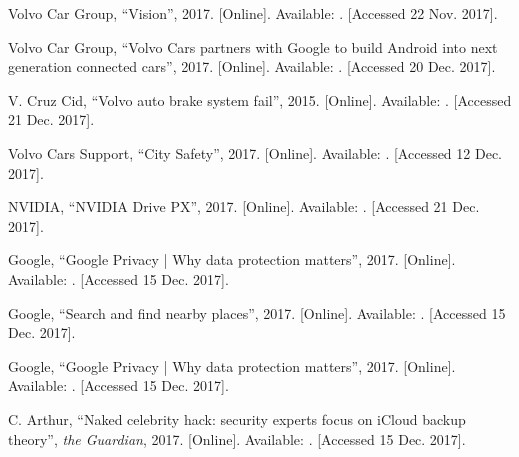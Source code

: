 \documentclass[conference]{IEEEtran}
\begin{document}
\begin{thebibliography}{00}
	Volvo Car Group,
	``Vision'',
	2017.
	[Online]. Available: 
	. 
	[Accessed 22 Nov. 2017].
	
	Volvo Car Group,
	``Volvo Cars partners with Google to build Android into next generation connected cars'',
	2017.
	[Online]. Available:
	.
	[Accessed 20 Dec. 2017].
	
	V. Cruz Cid,
	``Volvo auto brake system fail'',
	2015.
	[Online]. Available:
	.
	[Accessed 21 Dec. 2017].
	
	Volvo Cars Support,
	``City Safety'',
	2017.
	[Online]. Available: .
	[Accessed 12 Dec. 2017].
	
	NVIDIA,
	``NVIDIA Drive PX'',
	2017.
	[Online]. Available:
	.
	[Accessed 21 Dec. 2017].
	
	
	Google, 
	``Google Privacy | Why data protection matters'',
	2017.
	[Online]. Available:
	.
	[Accessed 15 Dec. 2017].
	
	Google,
	``Search and find nearby places'',
	2017.
	[Online]. Available: .
	[Accessed 15 Dec. 2017].
	
	Google,
	``Google Privacy | Why data protection matters'',
	2017.
	[Online]. Available:
	.
	[Accessed 15 Dec. 2017].
	
	C. Arthur,
	``Naked celebrity hack: security experts focus on iCloud backup theory'',
	\emph{the Guardian},
	2017.
	[Online]. Available: .
	[Accessed 15 Dec. 2017].
	

\end{thebibliography}
\end{document}

